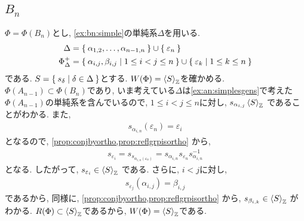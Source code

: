 \subsection{$B_{n}$}
\label{ex:bn:simpleges}
$\Phi=\Phi(B_n)$とし,
\cref{ex:bn:simple}の単純系$\Delta$を用いる.
\begin{align*}
  \Delta
  &=\Set{\alpha_{1,2},\ldots,\alpha_{n-1,n}}\cup\Set{\varepsilon_{n}}\\
  \Phi_\Delta^{+}
  &=\Set{\alpha_{i,j},\beta_{i,j}|1\leq i<j\leq n}\cup\Set{\varepsilon_{k}|1\leq k \leq n}
\end{align*}
である.
$S=\Set{s_\delta|\delta\in\Delta}$とする.
$W(\Phi)=\Braket{S}_{\mathbb{Z}}$を確かめる.
$\Phi(A_{n-1})\subset\Phi(B_n)$であり,
いま考えている$\Delta$は\cref{ex:an:simplesgens}で考えた$\Phi(A_{n-1})$の単純系を含んでいるので,
$1\leq i<j\leq n$に対し,
$s_{\alpha_{i,j}}\Braket{S}_{\mathbb{Z}}$
であることがわかる.
また,
\begin{align*}
  s_{\alpha_{i,n}}(\varepsilon_{n})=\varepsilon_{i}
\end{align*}
となるので,
\cref{prop:conjbyortho,prop:reflgrpisortho}
から,
\begin{align*}
  s_{\varepsilon_{i}}=s_{s_{\alpha_{i,n}(\varepsilon_{n})}}=
    s_{\alpha_{i,n}}s_{\varepsilon_{n}}s_{\alpha_{i,n}}^{-1}
\end{align*}
となる.
したがって, $s_{\varepsilon_{i}}\in\Braket{S}_{\mathbb{Z}}$
である.
さらに, $i<j$に対し,
\begin{align*}
  s_{\varepsilon_{j}}(\alpha_{i,j})=\beta_{i,j}
\end{align*}
であるから, 同様に, 
\cref{prop:conjbyortho,prop:reflgrpisortho}
から,
$s_{\beta_{i,k}}\in\Braket{S}_{\mathbb{Z}}$
がわかる.
$R(\Phi)\subset \Braket{S}_{\mathbb{Z}}$であるから,
$W(\Phi)=\Braket{S}_{\mathbb{Z}}$である.



